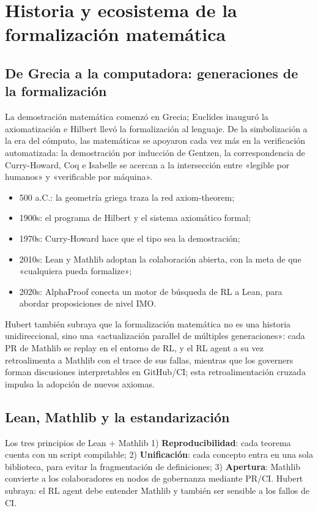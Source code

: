 \section{Historia y ecosistema de la formalización matemática}

\subsection{De Grecia a la computadora: generaciones de la formalización}
La demostración matemática comenzó en Grecia; Euclides inauguró la axiomatización e Hilbert llevó la formalización al lenguaje. De la simbolización a la era del cómputo, las matemáticas se apoyaron cada vez más en la verificación automatizada: la demostración por inducción de Gentzen, la correspondencia de Curry-Howard, Coq e Isabelle se acercan a la intersección entre «legible por humanos» y «verificable por máquina».
\begin{itemize}
    \item 500 a.C.: la geometría griega traza la red axiom-theorem;
    \item 1900s: el programa de Hilbert y el sistema axiomático formal;
    \item 1970s: Curry-Howard hace que el tipo sea la demostración;
    \item 2010s: Lean y Mathlib adoptan la colaboración abierta, con la meta de que «cualquiera pueda formalize»;
    \item 2020s: AlphaProof conecta un motor de búsqueda de RL a Lean, para abordar proposiciones de nivel IMO.
\end{itemize}

Hubert también subraya que la formalización matemática no es una historia unidireccional, sino una «actualización parallel de múltiples generaciones»: cada PR de Mathlib se replay en el entorno de RL, y el RL agent a su vez retroalimenta a Mathlib con el trace de sus fallas, mientras que los governers forman discusiones interpretables en GitHub/CI; esta retroalimentación cruzada impulsa la adopción de nuevos axiomas.

\subsection{Lean, Mathlib y la estandarización}
\begin{importantbox}{Los tres principios de Lean + Mathlib}
1) \textbf{Reproducibilidad}: cada teorema cuenta con un script compilable; 2) \textbf{Unificación}: cada concepto entra en una sola biblioteca, para evitar la fragmentación de definiciones; 3) \textbf{Apertura}: Mathlib convierte a los colaboradores en nodos de gobernanza mediante PR/CI. Hubert subraya: el RL agent debe entender Mathlib y también ser sensible a los fallos de CI.
\end{importantbox}


